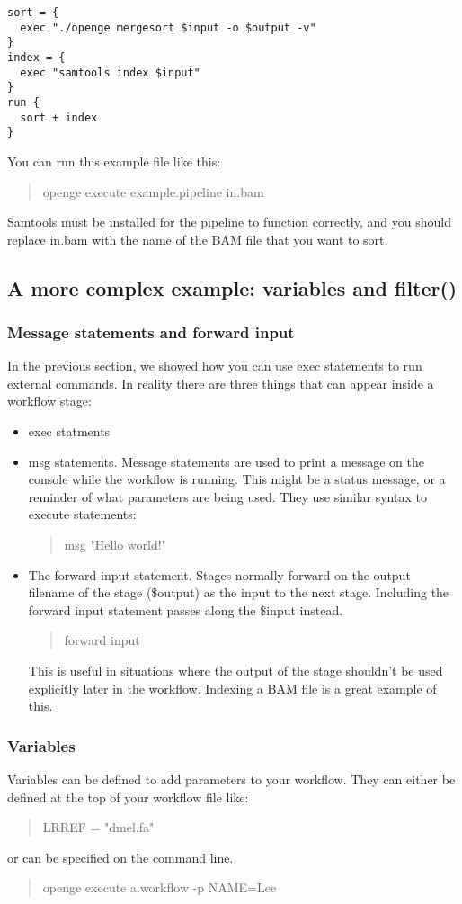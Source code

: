\documentclass[11pt]{article}
\newcommand {\cmd}[1] {\begin{quote}#1\end{quote}}
\begin{document}
\begin{verbatim}
sort = {
  exec "./openge mergesort $input -o $output -v"
}
index = {
  exec "samtools index $input"
}
run {
  sort + index
}
\end{verbatim}

You can run this example file like this:

\cmd{openge execute example.pipeline in.bam}

Samtools must be installed for the pipeline to function correctly, and you should replace in.bam with the name of the BAM file that you want to sort.

\subsection {A more complex example: variables and filter()}

\subsubsection{Message statements and forward input}
In the previous section, we showed how you can use exec statements to run external commands. In reality there are three things that can appear inside a workflow stage:
\begin{itemize}
\item exec statments
\item msg statements. Message statements are used to print a message on the console while the workflow is running. This might be a status message, or a reminder of what parameters are being used.  They use similar syntax to execute statements:
\cmd{msg "Hello world!"}
\item The forward input statement. Stages normally forward on the output filename of the stage (\$output) as  the input to the next stage. Including the forward input statement passes along the \$input instead.
\cmd{forward input}
This is useful in situations where the output of the stage shouldn't be used explicitly later in the workflow. Indexing a BAM file is a great example of this.
\end{itemize}

\subsubsection{Variables}
Variables can be defined to add parameters to your workflow. They can either be defined at the top of your workflow file like:
\cmd{LRREF = "dmel.fa"}
or can be specified on the command line.
\cmd{openge execute a.workflow -p NAME=Lee}
\end{document}

